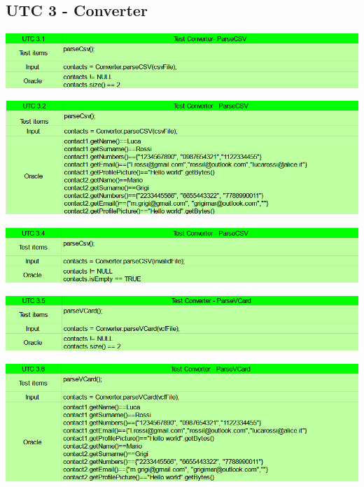 \subsection{UTC 3 - Converter}
\begin{center} \includegraphics[width=\linewidth]{images/UTC/3-1.png} \end{center}
\begin{center} \includegraphics[width=\linewidth]{images/UTC/3-2.png} \end{center}
\begin{center} \includegraphics[width=\linewidth]{images/UTC/3-4.png} \end{center}
\begin{center} \includegraphics[width=\linewidth]{images/UTC/3-5.png} \end{center}
\begin{center} \includegraphics[width=\linewidth]{images/UTC/3-6.png} \end{center}
